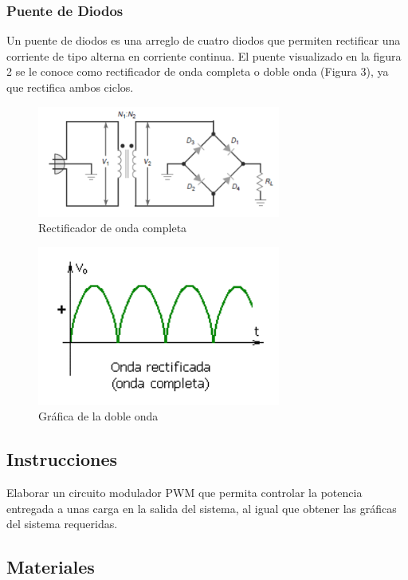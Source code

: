 \subsubsection{Puente de Diodos}

Un puente de diodos es una arreglo de cuatro diodos que permiten rectificar una corriente de tipo alterna en corriente continua. El puente visualizado en la figura 2 se le conoce como
rectificador de onda completa o doble onda (Figura 3), ya que rectifica ambos ciclos.

\begin{figure}
    \centering
    \includegraphics[width=8cm]{media/Rectificador.png}
    \caption{Rectificador de onda completa}
\end{figure}

\begin{figure}
    \centering
    \includegraphics[width=8cm]{media/OndaComp.png}
        \caption{Gráfica de la doble onda}
\end{figure}

\subsection{Instrucciones}

Elaborar un circuito modulador PWM que permita controlar la potencia entregada a unas carga en la salida del sistema, al igual que obtener las gráficas del sistema requeridas.

\subsection{Materiales}

